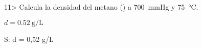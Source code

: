 \documentclass{article}
\begin{document}
\begin{multicols}{2}
\begin{exercise}
  11> Calcula la densidad del metano () a \SI{700}{\mmHg} y \SI{75}{\celsius}.
\end{exercise}
\begin{solution}
  $d = \SI{0,52}{\gram\per\liter}$
\end{solution}
S: d = 0,52 g/L
%
%
%
%
%
%
%
%
%
%
%
\end{multicols}
%
%
\end{document}
